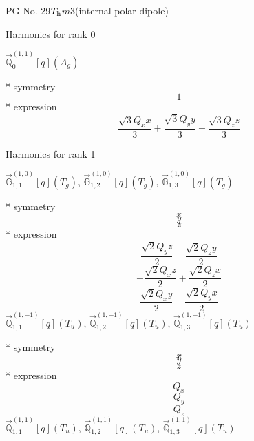 \documentclass[fleqn,8pt]{jsarticle}
\begin{document}
\setcounter{MaxMatrixCols}{32}

\renewcommand{\tablename}{Table~}
\renewcommand{\figurename}{Figure~}
\begin{center}
\LARGE
PG No. 29\quad$T_{\rm h}$\quad$m\bar{3}$\quad[ cubic ] (internal polar dipole)
\end{center}

\noindent * Harmonics for rank 0

\noindent\quad $\vec{\mathbb{Q}}_{0}^{(1,1)}[q](A_{g})$

\noindent\quad ** symmetry
\begin{dmath*}
1
\end{dmath*}
\noindent\quad ** expression
\begin{dmath*}
\frac{\sqrt{3} Q_{x} x}{3} + \frac{\sqrt{3} Q_{y} y}{3} + \frac{\sqrt{3} Q_{z} z}{3}
\end{dmath*}

\noindent * Harmonics for rank 1

\noindent\quad $\vec{\mathbb{G}}_{1,1}^{(1,0)}[q](T_{g})$, $\vec{\mathbb{G}}_{1,2}^{(1,0)}[q](T_{g})$, $\vec{\mathbb{G}}_{1,3}^{(1,0)}[q](T_{g})$

\noindent\quad ** symmetry
\begin{dmath*}
x
\end{dmath*}
\begin{dmath*}
y
\end{dmath*}
\begin{dmath*}
z
\end{dmath*}
\noindent\quad ** expression
\begin{dmath*}
\frac{\sqrt{2} Q_{y} z}{2} - \frac{\sqrt{2} Q_{z} y}{2}
\end{dmath*}
\begin{dmath*}
- \frac{\sqrt{2} Q_{x} z}{2} + \frac{\sqrt{2} Q_{z} x}{2}
\end{dmath*}
\begin{dmath*}
\frac{\sqrt{2} Q_{x} y}{2} - \frac{\sqrt{2} Q_{y} x}{2}
\end{dmath*}
\noindent\quad $\vec{\mathbb{Q}}_{1,1}^{(1,-1)}[q](T_{u})$, $\vec{\mathbb{Q}}_{1,2}^{(1,-1)}[q](T_{u})$, $\vec{\mathbb{Q}}_{1,3}^{(1,-1)}[q](T_{u})$

\noindent\quad ** symmetry
\begin{dmath*}
x
\end{dmath*}
\begin{dmath*}
y
\end{dmath*}
\begin{dmath*}
z
\end{dmath*}
\noindent\quad ** expression
\begin{dmath*}
Q_{x}
\end{dmath*}
\begin{dmath*}
Q_{y}
\end{dmath*}
\begin{dmath*}
Q_{z}
\end{dmath*}
\noindent\quad $\vec{\mathbb{Q}}_{1,1}^{(1,1)}[q](T_{u})$, $\vec{\mathbb{Q}}_{1,2}^{(1,1)}[q](T_{u})$, $\vec{\mathbb{Q}}_{1,3}^{(1,1)}[q](T_{u})$
\end{document}
